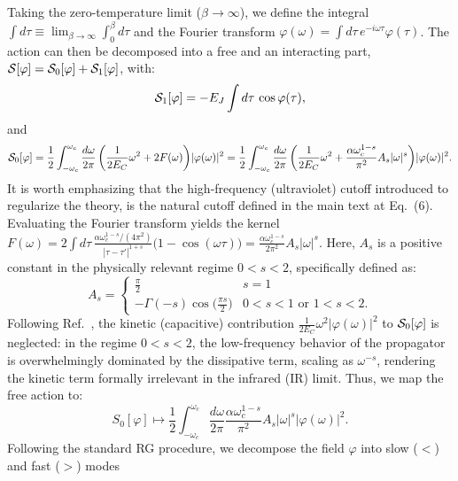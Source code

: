 \documentclass[aps,notitlepage,twocolumn,prl,nolongbibliography,superscriptaddress]{revtex4-2}
\begin{document}
Taking the zero-temperature limit ($\beta \to \infty$), we define the integral $\int d\tau \equiv \lim_{\beta \to \infty} \int_0^{\beta} d\tau$ and the Fourier transform $\varphi(\omega) = \int d\tau \, e^{-i\omega\tau} \varphi(\tau)$. The action can then be decomposed into a free and an interacting part, ${\cal S}[\varphi] = {\cal S}_0[\varphi] + {\cal S}_1[\varphi]$, with:
\begin{equation}
    {\cal S}_1[\varphi] = - E_J \int d\tau \, \cos \varphi(\tau),
\end{equation}
and
\begin{equation}
    {\cal S}_0[\varphi] = \frac{1}{2}\int_{-\omega_c}^{\omega_c} \frac{d\omega}{2\pi} \, \biggl(\frac{1}{2E_C}\omega^2 + 2F(\omega)\biggr)|\varphi(\omega)|^2 = \frac{1}{2}\int_{-\omega_c}^{\omega_c} \frac{d\omega}{2\pi} \, \biggl(\frac{1}{2E_C}\omega^2 + \frac{\alpha \omega_c^{1-s}}{\pi^2} A_s|\omega|^s\biggr)|\varphi(\omega)|^2.
\end{equation}
It is worth emphasizing that the high-frequency (ultraviolet) cutoff introduced to regularize the theory, is the natural cutoff defined in the main text at Eq.~(6).
Evaluating the Fourier transform yields the kernel $F(\omega) = 2\int d\tau \, \frac{\alpha \omega_c^{1-s} / (4\pi^2)}{|\tau-\tau'|^{1+s}} \bigl(1-\cos (\omega\tau)\bigr) = \frac{\alpha \omega_c^{1-s}}{2\pi^2} A_s|\omega|^s$. Here, $A_s$ is a positive constant in the physically relevant regime $0<s<2$, specifically defined as:
\begin{equation}
    A_s =
    \begin{cases}
\frac{\pi}{2} & s=1 \\
-\Gamma(-s)\cos\biggl(\frac{\pi s}{2}\biggr) & 0<s<1 \,\, \text{or} \,\, 1<s<2.
\end{cases}
\end{equation}
Following Ref.~\cite{Fisher_Zwerger}, the kinetic (capacitive) contribution $\frac{1}{2E_C}\omega^2 |\varphi(\omega)|^2$ to ${\cal S}_0[\varphi]$ is neglected: in the regime $0<s<2$, the low-frequency behavior of the propagator is overwhelmingly dominated by the dissipative term, scaling as $\omega^{-s}$, rendering the kinetic term formally irrelevant in the infrared (IR) limit. Thus, we map the free action to:
\begin{equation}
    S_0[\varphi] \mapsto \frac{1}{2} \int_{-\omega_c}^{\omega_c} \frac{d\omega}{2\pi} \frac{\alpha \omega_c^{1-s}}{\pi^2} A_s |\omega|^s |\varphi(\omega)|^2.
\end{equation}
Following the standard RG procedure, we decompose the field $\varphi$ into slow ($<$) and fast ($>$) modes
\end{document}
